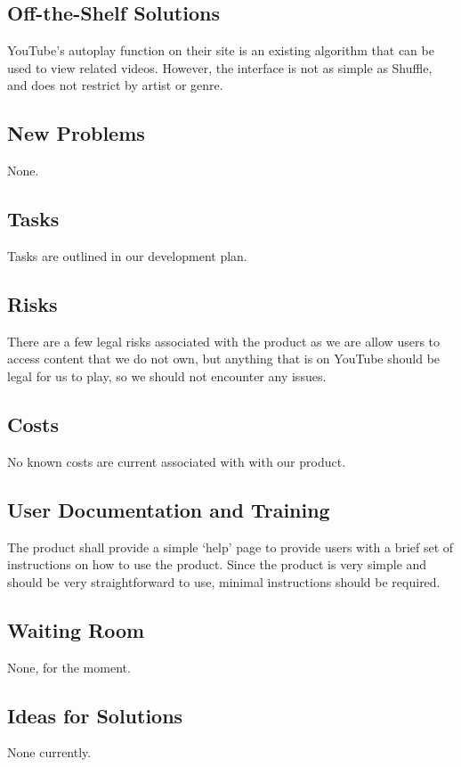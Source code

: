 \documentclass[12pt, titlepage]{article}
\begin{document}
\subsection{Off-the-Shelf Solutions}
YouTube's autoplay function on their site is an existing algorithm that can be used to view related videos.  However, the interface is not as simple as Shuffle, and does not restrict by artist or genre.
\subsection{New Problems}
None.
\subsection{Tasks}
Tasks are outlined in our development plan.
\subsection{Risks}
There are a few legal risks associated with the product as we are allow users to access content that we do not own, but anything that is on YouTube should be legal for us to play, so we should not encounter any issues.
\subsection{Costs}

No known costs are current associated with with our product.

\subsection{User Documentation and Training}

The product shall provide a simple ‘help’ page to provide users with a brief set of instructions on how to use the product.  Since the product is very simple and should be very straightforward to use, minimal instructions should be required.

\subsection{Waiting Room}

None, for the moment.

\subsection{Ideas for Solutions}
None currently.
\end{document}
